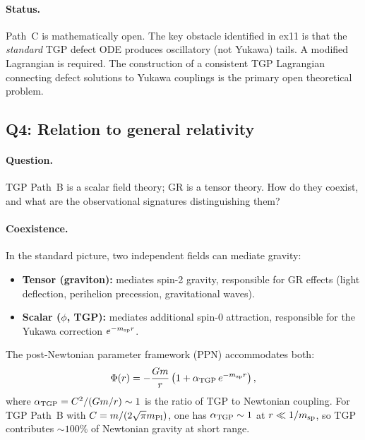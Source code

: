 \paragraph{Status.}
Path~C is mathematically open.  The key obstacle identified in ex11 is
that the \emph{standard} TGP defect ODE produces oscillatory (not Yukawa)
tails.  A modified Lagrangian is required.  The construction of a
consistent TGP Lagrangian connecting defect solutions to Yukawa couplings
is the primary open theoretical problem.

\subsection{Q4: Relation to general relativity}
\label{sec:gr_relation}

\paragraph{Question.}
TGP Path~B is a scalar field theory; GR is a tensor theory.
How do they coexist, and what are the observational signatures
distinguishing them?

\paragraph{Coexistence.}
In the standard picture, two independent fields can mediate gravity:
\begin{itemize}
\item \textbf{Tensor (graviton):} mediates spin-2 gravity, responsible
  for GR effects (light deflection, perihelion precession, gravitational waves).
\item \textbf{Scalar ($\phi$, TGP):} mediates additional spin-0 attraction,
  responsible for the Yukawa correction $e^{-m_{\rm sp}r}$.
\end{itemize}
The post-Newtonian parameter framework (PPN) accommodates both:
\begin{equation}
  \Phi(r) = -\frac{Gm}{r}\left(1 + \alpha_{\rm TGP}\,e^{-m_{\rm sp}r}\right),
\end{equation}
where $\alpha_{\rm TGP}=C^2/(Gm/r)\sim1$ is the ratio of TGP to Newtonian
coupling.  For TGP Path~B with $C=m/(2\sqrt{\pi}m_{\rm Pl})$, one has
$\alpha_{\rm TGP}\sim1$ at $r\ll1/m_{\rm sp}$, so TGP contributes
$\sim 100\%$ of Newtonian gravity at short range.

